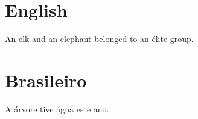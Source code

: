 \documentclass[12pt]{article}
\begin{document}
\section{English}
An \gls{elk} and an \gls{elephant} belonged to an \gls{élite} group. 

\printunsrtglossary 

\section{Brasileiro}
A \gls{árvore} tive \gls{água} este \gls{ano}. 

\printunsrtglossary[type=dictionary] 
\end{document}
